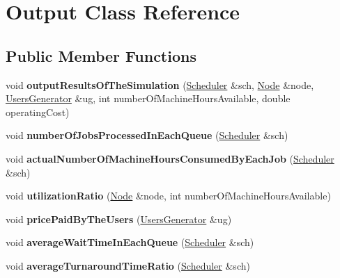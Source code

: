\hypertarget{class_output}{}\section{Output Class Reference}
\label{class_output}
\subsection*{Public Member Functions}
\begin{DoxyCompactItemize}
\item 
\mbox{\label{class_output_acb9d8ee43f81560de2beec11bf8983bf}} 
void {\bfseries output\+Results\+Of\+The\+Simulation} (\mbox{\hyperlink{class_scheduler}{Scheduler}} \&sch, \mbox{\hyperlink{class_node}{Node}} \&node, \mbox{\hyperlink{class_users_generator}{Users\+Generator}} \&ug, int number\+Of\+Machine\+Hours\+Available, double operating\+Cost)
\item 
\mbox{\label{class_output_a37b5da24dd73ba9c7fbc1d70807ee59a}} 
void {\bfseries number\+Of\+Jobs\+Processed\+In\+Each\+Queue} (\mbox{\hyperlink{class_scheduler}{Scheduler}} \&sch)
\item 
\mbox{\label{class_output_a17c8f535b597f35ae4756695aed70da4}} 
void {\bfseries actual\+Number\+Of\+Machine\+Hours\+Consumed\+By\+Each\+Job} (\mbox{\hyperlink{class_scheduler}{Scheduler}} \&sch)
\item 
\mbox{\label{class_output_aeae2d017558edea58d43914e9601600c}} 
void {\bfseries utilization\+Ratio} (\mbox{\hyperlink{class_node}{Node}} \&node, int number\+Of\+Machine\+Hours\+Available)
\item 
\mbox{\label{class_output_a0195b7d1a95f2a5d7ae4fc84f513ce58}} 
void {\bfseries price\+Paid\+By\+The\+Users} (\mbox{\hyperlink{class_users_generator}{Users\+Generator}} \&ug)
\item 
\mbox{\label{class_output_a0d052cfab8080543ea59abf505523d27}} 
void {\bfseries average\+Wait\+Time\+In\+Each\+Queue} (\mbox{\hyperlink{class_scheduler}{Scheduler}} \&sch)
\item 
\mbox{\label{class_output_ac9a0aeeefa8ef13cf8849487ea0133be}} 
void {\bfseries average\+Turnaround\+Time\+Ratio} (\mbox{\hyperlink{class_scheduler}{Scheduler}} \&sch)

\end{DoxyCompactItemize}
